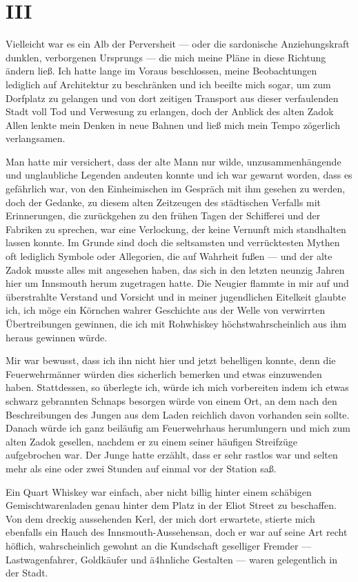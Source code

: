 \chapter*{III}

Vielleicht war es ein Alb der Perversheit --- oder die sardonische Anziehungskraft dunklen, verborgenen Ursprungs --- die mich meine Pläne in diese Richtung ändern ließ. Ich hatte lange im Voraus beschlossen, meine Beobachtungen lediglich auf Architektur zu beschränken und ich beeilte mich sogar, um zum Dorfplatz zu gelangen und von dort zeitigen Transport aus dieser verfaulenden Stadt voll Tod und Verwesung zu erlangen, doch der Anblick des alten Zadok Allen lenkte mein Denken in neue Bahnen und ließ mich mein Tempo zögerlich verlangsamen.

Man hatte mir versichert, dass der alte Mann nur wilde, unzusammenhängende und unglaubliche Legenden andeuten konnte und ich war gewarnt worden, dass es gefährlich war, von den Einheimischen im Gespräch mit ihm gesehen zu werden, doch der Gedanke, zu diesem alten Zeitzeugen des städtischen Verfalls mit Erinnerungen, die zurückgehen zu den frühen Tagen der Schifferei und der Fabriken zu sprechen, war eine Verlockung, der keine Vernunft mich standhalten lassen konnte. Im Grunde sind doch die seltsamsten und verrücktesten Mythen oft lediglich Symbole oder Allegorien, die auf Wahrheit fußen --- und der alte Zadok musste alles mit angesehen haben, das sich in den letzten neunzig Jahren hier um Innsmouth herum zugetragen hatte. Die Neugier flammte in mir auf und überstrahlte Verstand und Vorsicht und in meiner jugendlichen Eitelkeit glaubte ich, ich möge ein Körnchen wahrer Geschichte aus der Welle von verwirrten Übertreibungen gewinnen, die ich mit Rohwhiskey höchstwahrscheinlich aus ihm heraus gewinnen würde.

Mir war bewusst, dass ich ihn nicht hier und jetzt behelligen konnte, denn die Feuerwehrmänner würden dies sicherlich bemerken und etwas einzuwenden haben. Stattdessen, so überlegte ich, würde ich mich vorbereiten indem ich etwas schwarz gebrannten Schnaps besorgen würde von einem Ort, an dem nach den Beschreibungen des Jungen aus dem Laden reichlich davon vorhanden sein sollte. Danach würde ich ganz beiläufig am Feuerwehrhaus herumlungern und mich zum alten Zadok gesellen, nachdem er zu einem seiner häufigen Streifzüge aufgebrochen war. Der Junge hatte erzählt, dass er sehr rastlos war und selten mehr als eine oder zwei Stunden auf einmal vor der Station saß.

Ein Quart Whiskey war einfach, aber nicht billig hinter einem schäbigen Gemischtwarenladen genau hinter dem Platz in der Eliot Street zu beschaffen. Von dem dreckig aussehenden Kerl, der mich dort erwartete, stierte mich ebenfalls ein Hauch des \glqq Innsmouth-Aussehens\grqq an, doch er war auf seine Art recht höflich, wahrscheinlich gewohnt an die Kundschaft geselliger Fremder --- Lastwagenfahrer, Goldkäufer und ä4hnliche Gestalten --- waren gelegentlich in der Stadt.

